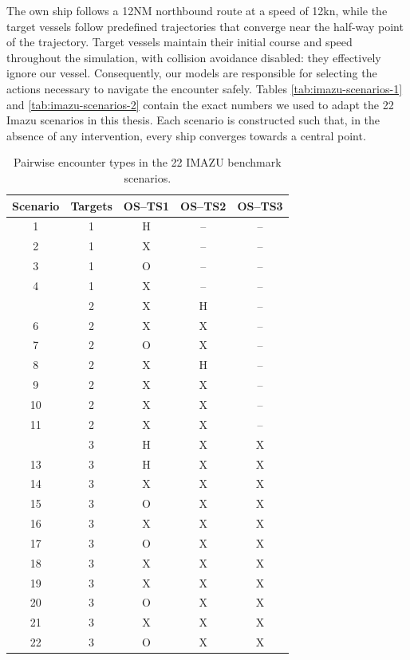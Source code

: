 \documentclass[10pt]{reportMaster}
\begin{document}
The own ship follows a 12NM northbound route at a speed of 12kn, while the target vessels follow predefined trajectories that converge near the half-way point of the trajectory. Target vessels maintain their initial course and speed throughout the simulation, with collision avoidance disabled: they effectively ignore our vessel. Consequently, our models are responsible for selecting the actions necessary to navigate the encounter safely. Tables \ref{tab:imazu-scenarios-1} and \ref{tab:imazu-scenarios-2} contain the exact numbers we used to adapt the 22 Imazu scenarios in this thesis. Each scenario is constructed such that, in the absence of any intervention, every ship converges towards a central point. 


\begin{table}[t]
\centering
\caption{Pairwise encounter types in the 22 IMAZU
benchmark scenarios.}
\label{tab:imazu-encounter-types}
\begin{threeparttable}

\small
\setlength{\tabcolsep}{10pt}
\renewcommand{\arraystretch}{1.1}

\begin{tabular}{@{}c c c c c@{}}
\toprule
\textbf{Scenario}
& \textbf{Targets}
& \textbf{OS--TS1}
& \textbf{OS--TS2}
& \textbf{OS--TS3} \\
\midrule

1  & 1 & H & -- & -- \\
2  & 1 & X & -- & -- \\
3  & 1 & O & -- & -- \\
4  & 1 & X & -- & -- \\

\addlinespace
5  & 2 & X & H & -- \\
6  & 2 & X & X & -- \\
7  & 2 & O & X & -- \\
8  & 2 & X & H & -- \\
9  & 2 & X & X & -- \\
10 & 2 & X & X & -- \\
11 & 2 & X & X & -- \\

\addlinespace
12 & 3 & H & X & X \\
13 & 3 & H & X & X \\
14 & 3 & X & X & X \\
15 & 3 & O & X & X \\
16 & 3 & X & X & X \\
17 & 3 & O & X & X \\
18 & 3 & X & X & X \\
19 & 3 & X & X & X \\
20 & 3 & O & X & X \\
21 & 3 & X & X & X \\
22 & 3 & O & X & X \\


\end{tabular}
\end{threeparttable}
\end{table}
\end{document}
